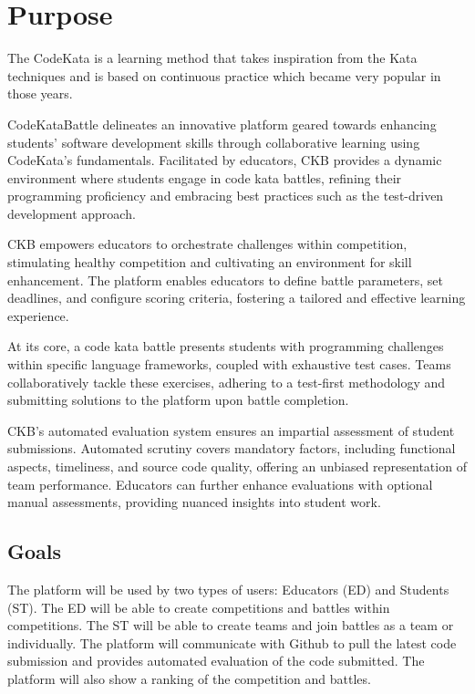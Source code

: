 \renewcommand{\arraystretch}{1.5} %

\section{Purpose}
\label{s:Purpose}%

The CodeKata is a learning method that takes inspiration from the Kata techniques and is based on continuous practice which became very popular in those years.

CodeKataBattle delineates an innovative platform geared towards enhancing students' software development skills through collaborative learning using CodeKata’s fundamentals. Facilitated by educators, CKB provides a dynamic environment where students engage in code kata battles, refining their programming proficiency and embracing best practices such as the test-driven development approach.

CKB empowers educators to orchestrate challenges within competition, stimulating healthy competition and cultivating an environment for skill enhancement. The platform enables educators to define battle parameters, set deadlines, and configure scoring criteria, fostering a tailored and effective learning experience.

At its core, a code kata battle presents students with programming challenges within specific language frameworks, coupled with exhaustive test cases. Teams collaboratively tackle these exercises, adhering to a test-first methodology and submitting solutions to the platform upon battle completion.

CKB's automated evaluation system ensures an impartial assessment of student submissions. Automated scrutiny covers mandatory factors, including functional aspects, timeliness, and source code quality, offering an unbiased representation of team performance. Educators can further enhance evaluations with optional manual assessments, providing nuanced insights into student work.

\pagebreak

\subsection{Goals}
\label{ss:goals}%
The platform will be used by two types of users: Educators (ED) and Students (ST). The ED will be able to create competitions and battles within competitions. The ST will be able to create teams and join battles as a team or individually. The platform will communicate with Github to pull the latest code submission and provides automated evaluation of the code submitted. The platform will also show a ranking of the competition and battles.

